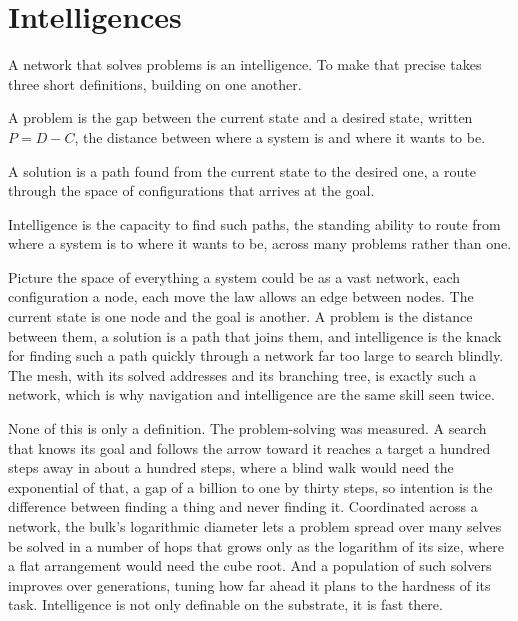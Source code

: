 \section{Intelligences}

A network that solves problems is an intelligence. To make that precise takes three short definitions, building on one another.

\begin{definition}[Problem]
A problem is the gap between the current state and a desired state, written $P = D - C$, the distance between where a system is and where it wants to be.
\end{definition}

\begin{definition}[Solution]
A solution is a path found from the current state to the desired one, a route through the space of configurations that arrives at the goal.
\end{definition}

\begin{definition}[Intelligence]
Intelligence is the capacity to find such paths, the standing ability to route from where a system is to where it wants to be, across many problems rather than one.
\end{definition}

Picture the space of everything a system could be as a vast network, each configuration a node, each move the law allows an edge between nodes. The current state is one node and the goal is another. A problem is the distance between them, a solution is a path that joins them, and intelligence is the knack for finding such a path quickly through a network far too large to search blindly. The mesh, with its solved addresses and its branching tree, is exactly such a network, which is why navigation and intelligence are the same skill seen twice.

None of this is only a definition. The problem-solving was measured. A search that knows its goal and follows the arrow toward it reaches a target a hundred steps away in about a hundred steps, where a blind walk would need the exponential of that, a gap of a billion to one by thirty steps, so intention is the difference between finding a thing and never finding it. Coordinated across a network, the bulk's logarithmic diameter lets a problem spread over many selves be solved in a number of hops that grows only as the logarithm of its size, where a flat arrangement would need the cube root. And a population of such solvers improves over generations, tuning how far ahead it plans to the hardness of its task. Intelligence is not only definable on the substrate, it is fast there.

